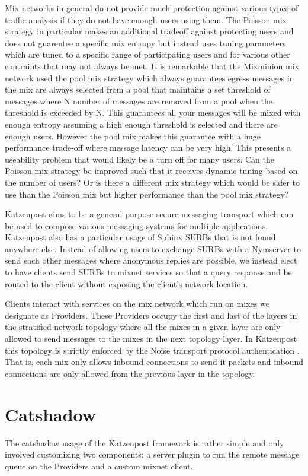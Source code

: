 \documentclass[conference]{IEEEtran}
\begin{document}
Mix networks in general do not provide much protection against various
types of traffic analysis if they do not have enough users using
them. The Poisson mix strategy in particular makes an additional
tradeoff against protecting users and does not guarentee a specific
mix entropy but instead uses tuning parameters which are tuned to a
specific range of participating users and for various other contraints
that may not always be met. It is remarkable that the Mixminion mix
network used the pool mix strategy which always guarantees egress
messages in the mix are always selected from a pool that maintains a
set threshold of messages where N number of messages are removed from
a pool when the threshold is exceeded by N. This guarantees all your
messages will be mixed with enough entropy assuming a high enough
threshold is selected and there are enough users. However the pool mix
makes this guarantee with a huge performance trade-off where message
latency can be very high. This presents a useability problem that
would likely be a turn off for many users. Can the Poisson mix
strategy be improved such that it receives dynamic tuning based on the
number of users?  Or is there a different mix strategy which would be
safer to use than the Poisson mix but higher performance than the pool
mix strategy?

Katzenpost aims to be a general purpose secure messaging transport
which can be used to compose various messaging systems for multiple
applications. Katzenpost also has a particular usage of Sphinx SURBs
that is not found anywhere else. Instead of allowing users to exchange
SURBs with a Nymserver \cite{minion-design} to send each other messages
where anonymous replies are possible, we instead elect to have clients
send SURBs to mixnet services so that a query response and be routed
to the client without exposing the client's network location.

Clients interact with services on the mix network which run on mixes
we designate as Providers. These Providers occupy the first and last
of the layers in the stratified network topology where all the mixes
in a given layer are only allowed to send messages to the mixes in the
next topology layer. In Katzenpost this topology is strictly enforced
by the Noise transport protocol authentication \cite{KatzMixnet}
\cite{KatzMixWire}. That is, each mix only allows inbound connections
to send it packets and inbound connections are only allowed from the
previous layer in the topology.

\section{Catshadow}
The catshadow usage of the Katzenpost framework is rather simple
and only involved customizing two components: a server plugin to
run the remote message queue on the Providers and a custom mixnet
client.
\end{document}
